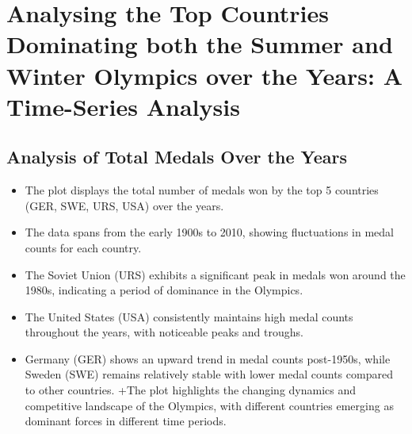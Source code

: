 \documentclass[12pt,preprint, authoryear]{elsarticle}
\numberwithin{equation}{section}
\numberwithin{figure}{section}
\numberwithin{table}{section}
\def\tightlist{} %
\begin{document}
\hypertarget{analysing-the-top-countries-dominating-both-the-summer-and-winter-olympics-over-the-years-a-time-series-analysis}{%
\section{Analysing the Top Countries Dominating both the Summer and
Winter Olympics over the Years: A Time-Series
Analysis}\label{analysing-the-top-countries-dominating-both-the-summer-and-winter-olympics-over-the-years-a-time-series-analysis}}

\hypertarget{analysis-of-total-medals-over-the-years}{%
\subsection{Analysis of Total Medals Over the
Years}\label{analysis-of-total-medals-over-the-years}}

\begin{itemize}
\tightlist
\item
  The plot displays the total number of medals won by the top 5
  countries (GER, SWE, URS, USA) over the years.
\item
  The data spans from the early 1900s to 2010, showing fluctuations in
  medal counts for each country.
\item
  The Soviet Union (URS) exhibits a significant peak in medals won
  around the 1980s, indicating a period of dominance in the Olympics.
\item
  The United States (USA) consistently maintains high medal counts
  throughout the years, with noticeable peaks and troughs.
\item
  Germany (GER) shows an upward trend in medal counts post-1950s, while
  Sweden (SWE) remains relatively stable with lower medal counts
  compared to other countries. +The plot highlights the changing
  dynamics and competitive landscape of the Olympics, with different
  countries emerging as dominant forces in different time periods.
\end{itemize}
\end{document}
